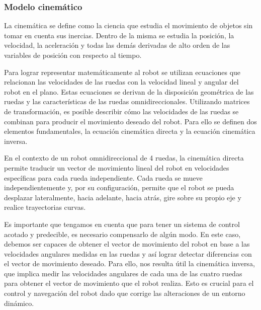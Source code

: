 

\subsubsection{Modelo cinemático}

La cinemática se define como la ciencia que estudia el movimiento de objetos sin tomar en cuenta sus inercias. Dentro de la misma se estudia la posición, la velocidad, la aceleración y todas las demás derivadas de alto orden de las variables de posición con respecto al tiempo.

Para lograr representar matemáticamente al robot se utilizan ecuaciones que relacionan las velocidades de las ruedas con la velocidad lineal y angular del robot en el plano. Estas ecuaciones se derivan de la disposición geométrica de las ruedas y las características de las ruedas omnidireccionales. Utilizando matrices de transformación, es posible describir cómo las velocidades de las ruedas se combinan para producir el movimiento deseado del robot. Para ello se definen dos elementos fundamentales, la ecuación cinemática directa y la ecuación cinemática inversa. \cite{tzafestas2013introduction}

En el contexto de un robot omnidireccional de 4 ruedas, la cinemática directa permite traducir un vector de movimiento lineal del robot en velocidades específicas para cada rueda independiente. Cada rueda se mueve independientemente y, por su configuración, permite que el robot se pueda desplazar lateralmente, hacia adelante, hacia atrás, gire sobre su propio eje y realice trayectorias curvas. \cite{rijalusalamkinematics}

Es importante que tengamos en cuenta que para tener un sistema de control acotado y predecible, es necesario compensarlo de algún modo. En este caso, debemos ser capaces de obtener el vector de movimiento del robot en base a las velocidades angulares medidas en las ruedas y así lograr detectar diferencias con el vector de movimiento deseado. Para ello, nos resulta útil la cinemática inversa, que implica medir las velocidades angulares de cada una de las cuatro ruedas para obtener el vector de movimiento que el robot realiza. Esto es crucial para el control y navegación del robot dado que corrige las alteraciones de un entorno dinámico.

